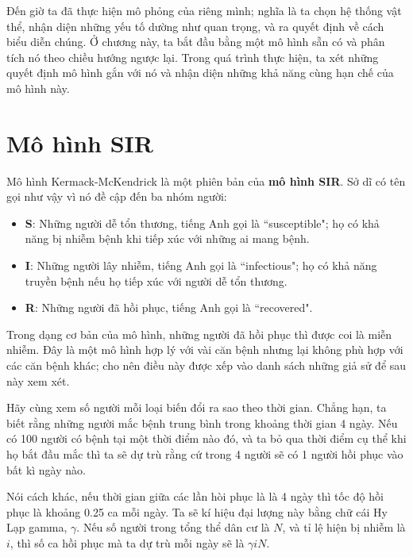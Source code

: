 \documentclass[12pt]{book}
\theoremstyle{exercise}
\begin{document}

Đến giờ ta đã thực hiện mô phỏng của riêng mình; nghĩa là ta chọn hệ thống vật thể, nhận diện những yếu tố dường như quan trọng, và ra quyết định về cách biểu diễn chúng. Ở chương này, ta bắt đầu bằng một mô hình sẵn có và phân tích nó theo chiều hướng ngược lại. Trong quá trình thực hiện, ta xét những quyết định mô hình gắn với nó và nhận diện những khả năng cùng hạn chế của mô hình này.


\section{Mô hình SIR}

Mô hình Kermack-McKendrick là một phiên bản của {\bf mô hình SIR}. Sở dĩ có tên gọi như vậy vì nó đề cập đến ba nhóm người:

\begin{itemize}

\item {\bf S}: Những người dễ tổn thương, tiếng Anh gọi là ``susceptible"; họ có khả năng bị nhiễm bệnh khi tiếp xúc với những ai mang bệnh.

\item {\bf I}: Những người lây nhiễm, tiếng Anh gọi là ``infectious"; họ có khả năng truyền bệnh nếu họ tiếp xúc với người dễ tổn thương.

\item {\bf R}: Những người đã hồi phục, tiếng Anh gọi là ``recovered".

\end{itemize}

Trong dạng cơ bản của mô hình, những người đã hồi phục thì được coi là miễn nhiễm. Đây là một mô hình hợp lý với vài căn bệnh nhưng lại không phù hợp với các căn bệnh khác; cho nên điều này được xếp vào danh sách những giả sử để sau này xem xét.

Hãy cùng xem số người mỗi loại biến đổi ra sao theo thời gian. Chẳng hạn, ta biết rằng những người mắc bệnh trung bình trong khoảng thời gian 4 ngày. Nếu có 100 người có bệnh tại một thời điểm nào đó, và ta bỏ qua thời điểm cụ thể khi họ bắt đầu mắc thì ta sẽ dự trù rằng cứ trong 4 người sẽ có 1 người hồi phục vào bất kì ngày nào. 

Nói cách khác, nếu thời gian giữa các lần hòi phục là là 4 ngày thì tốc độ hồi phục là khoảng 0.25 ca mỗi ngày. Ta sẽ kí hiệu đại lượng này bằng chữ cái Hy Lạp gamma,  $\gamma$. Nếu số người trong tổng thể dân cư là $N$, và tỉ lệ hiện bị nhiễm là $i$, thì số ca hồi phục mà ta dự trù mỗi ngày sẽ là $\gamma i N$.
\end{document}
